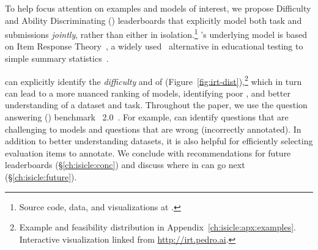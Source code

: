 To help focus attention on examples and models of interest, we propose Difficulty and Ability Discriminating (\name{}) leaderboards that explicitly model both task and submissions \emph{jointly}, rather than either in isolation.\footnote{Source code, data, and visualizations at \projecturl{}.}
\name{}'s underlying model is based on Item Response
Theory~\citep[, reviewed in \S\ref{ch:isicle:lead}]{lord1968test,baker2001irt}, a widely used~\citep{van2016assess} alternative in educational testing to
simple
summary statistics~\citep{edgeworth1888exams}.

\name{} can explicitly identify the \emph{difficulty} and \emph{\discability{}} of \itms{} (Figure~\ref{fig:irt-dist}),\footnote{
  Example and feasibility distribution in Appendix~\ref{ch:isicle:apx:examples}.
  Interactive visualization linked from \href{https://irt.pedro.ai}{http://irt.pedro.ai}.
} which in turn can lead to a more nuanced ranking of models, identifying poor \itms{}, and better understanding of a dataset and task.
Throughout the paper, we use the question answering (\qa{}) benchmark \squad{}~2.0~\citep{rajpurkar2018know}.
For example, \name{} can identify questions that are challenging to models and questions that are wrong (incorrectly annotated).
In addition to better understanding datasets, it is also helpful for
efficiently selecting evaluation items to annotate.
We conclude with recommendations for future leaderboards (\S\ref{ch:isicle:conc}) and discuss where \irt{} in \nlp{} can go next (\S\ref{ch:isicle:future}).
